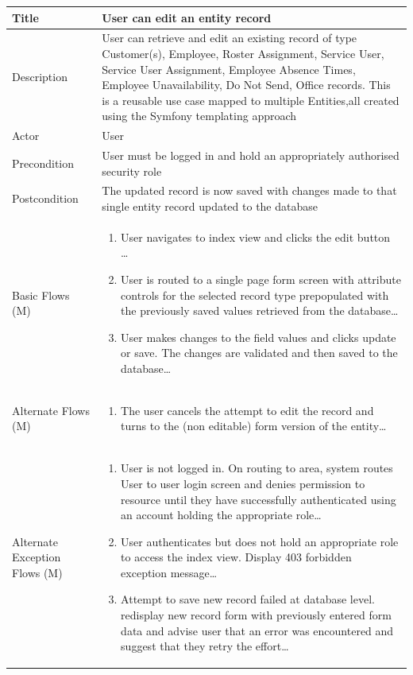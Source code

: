 \documentclass[a4paper,12pt]{article}
\newcommand\addrow[2]{#1 &#2\\ }
\newcommand\addheading[2]{#1 &#2\\ \hline}
\newcommand\tabularhead{\begin{tabular}{lp{11cm}}
\hline
}
\newcommand\addmulrow[2]{ \begin{minipage}[t][][t]{3cm}#1\end{minipage}%
   &\begin{minipage}[t][][t]{11cm}
    \begin{enumerate} #2   \end{enumerate}
    \end{minipage}\\ }
\newenvironment{usecase}{\tabularhead}
{\hline\end{tabular}}
\begin{document}
\begin{samepage}
\begin{usecase}
    \addheading{Title}{User can edit an entity record }
  \addheading{Description}{User can retrieve and edit an existing record of type Customer(s), Employee, Roster Assignment, Service User, Service User Assignment, Employee Absence Times, Employee Unavailability, Do Not Send, Office records. This is a reusable use case mapped to multiple Entities,all created using the Symfony templating approach}
  \addheading{Actor}{User} 
  \addrow{Precondition}{User must be logged in and hold an appropriately authorised security role}
  \addrow{Postcondition}{The updated record is now saved with changes made to that single entity record updated to the database}
  \addmulrow{Basic Flows (M)}{\item User navigates to index view and clicks the edit button \ldots
                                  \item User is routed to a single page form screen with attribute controls for the selected record type prepopulated with the previously saved values retrieved from the database\ldots
                                  \item User makes changes to the field values and clicks update or save. The changes are validated and then saved to the database\ldots}
  \addmulrow{Alternate  Flows (M)}{\item The user cancels the attempt to edit the record and turns to the (non editable) form version of the entity\ldots}
  \addmulrow{Alternate Exception Flows (M)}{\item User is not logged in. On routing to area, system routes User to user login screen and denies permission to resource until they have successfully authenticated using an account holding the appropriate role\ldots
                                                                      \item User authenticates but does not hold an appropriate role to access the index view. Display 403 forbidden exception message\ldots
                                                                      \item Attempt to save new record failed at database level. redisplay new record form with previously entered form data and advise user that an error was encountered and suggest that they retry the effort\ldots}

\end{usecase}


\end{samepage}
\end{document}
